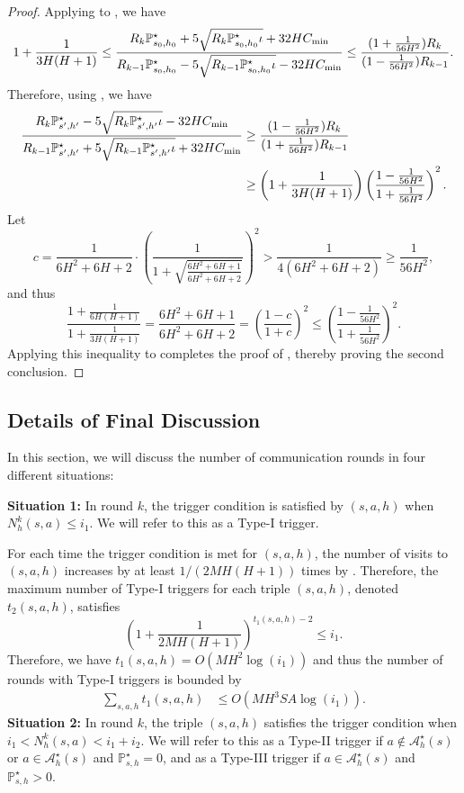 \documentclass{article}
\begin{document}
\begin{proof}
Applying  to , we have
$$1+\frac{1}{3H(H+1)} \leq \frac{R_{k}\mathbb{P}_{s_0,h_0}^{\star} + 5\sqrt{R_{k}\mathbb{P}_{s_0,h_0}^{\star}\iota} + 32HC_{\textnormal{min}}}{R_{k-1}\mathbb{P}_{s_0,h_0}^{\star} - 5\sqrt{R_{k-1}\mathbb{P}_{s_0,h_0}^{\star}\iota} - 32HC_{\textnormal{min}}} \leq \frac{(1+\frac{1}{56H^2})R_{k}}{(1-\frac{1}{56H^2})R_{k-1}}.$$
Therefore, using , we have
\begin{align}
\label{middlegoal1}
    \frac{R_{k}\mathbb{P}_{s',h'}^{\star} - 5\sqrt{R_{k}\mathbb{P}_{s',h'}^{\star}\iota} - 32HC_{\textnormal{min}}}{R_{k-1}\mathbb{P}_{s',h'}^{\star} + 5\sqrt{R_{k-1}\mathbb{P}_{s',h'}^{\star}\iota} + 32HC_{\textnormal{min}}}&\geq \frac{(1-\frac{1}{56H^2})R_{k}}{(1+\frac{1}{56H^2})R_{k-1}} \nonumber\\
    & \geq \left(1+\frac{1}{3H(H+1)}\right)\left(\frac{1-\frac{1}{56H^2}}{1+\frac{1}{56H^2}}\right)^2.
\end{align}
Let
$$c = \frac{1}{6H^2+6H+2}\cdot \left(\frac{1}{1+\sqrt{\frac{6H^2+6H+1}{6H^2+6H+2}}}\right)^2 >  \frac{1}{4(6H^2+6H+2)} \geq \frac{1}{56H^2},$$
and thus
$$\frac{1+\frac{1}{6H(H+1)}}{1+\frac{1}{3H(H+1)}} = \frac{6H^2+6H+1}{6H^2+6H+2} = \left(\frac{1-c}{1+c}\right)^2  \leq \left(\frac{1-\frac{1}{56H^2}}{1+\frac{1}{56H^2}}\right)^2.$$
Applying this inequality to  completes the proof of , thereby proving the second conclusion.
\end{proof}
\subsection{Details of Final Discussion}
\label{discussion}
In this section, we will discuss the number of communication rounds in four different situations:
 
 \textbf{Situation 1:} In round $k$, the trigger condition is satisfied by $(s,a,h)$ when $N_h^k(s,a) \leq i_1$. We will refer to this as a Type-I trigger.
    
    For each time the trigger condition is met for $(s,a,h)$, the number of visits to $(s,a,h)$ increases by at least $1/(2MH(H+1))$ times by . Therefore, the maximum number of Type-I triggers for each triple $(s,a,h)$, denoted $t_2(s,a,h)$, satisfies
    $$ \left( 1+ \frac{1}{2MH(H+1)}\right)^{t_1(s,a,h)-2} \leq i_1.$$
    Therefore, we have $t_1(s,a,h) = O(MH^2\log(i_1))$ and thus the number of rounds with Type-I triggers is bounded by
    \begin{align*}
        \sum_{s,a,h }t_1(s,a,h) &\leq O\left(MH^3SA\log\left(i_1\right)\right).
    \end{align*}
\textbf{Situation 2:} In round $k$, the triple $(s,a,h)$ satisfies the trigger condition when $ i_1 < N_h^k(s,a) < i_1+i_2$. We will refer to this as a Type-II trigger if \( a \notin \mathcal{A}_h^{\star}(s) \) or \( a \in \mathcal{A}_h^{\star}(s) \) and \( \mathbb{P}_{s,h}^{\star} = 0 \), and as a Type-III trigger if \( a \in \mathcal{A}_h^{\star}(s) \) and \( \mathbb{P}_{s,h}^{\star} > 0 \).
\end{document}

